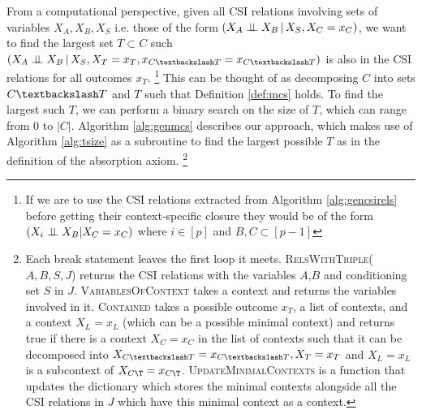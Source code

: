 \documentclass{tufte-book}
\begin{document}
From a computational perspective, given all CSI relations involving sets of variables \(X_A,X_B,X_S\) i.e. those of the form \((X_A \perp \!\!\! \perp X_B \,|\, X_S, X_C=x_C)\), we want to find the largest set \(T \subset C\) such \((X_A \indep X_B \,|\, X_S, X_T=x_T, x_{C \textbackslash T} = x_{C \textbackslash T})\) is also in the CSI relations for all outcomes \(x_T\).  \footnote{If we are to use the CSI relations extracted from Algorithm \ref{alg:gencsirels} before getting their context-specific closure they would be of the form \\ $(X_i \perp \!\!\! \perp X_B | X_C=x_C)$ where $i \in [p]$ and $B ,C \subset [p-1]$}  This can be thought of as decomposing \(C\) into sets \(C \textbackslash T\) and \(T\) such that Definition \ref{def:mcs} holds. To find the largest such \(T\), we can perform a binary search on the size of \(T\), which can range from \(0\) to \(|C|\). Algorithm \ref{alg:genmcs} describes our approach, which makes use of Algorithm \ref{alg:tsize} as a subroutine to find the largest possible \(T\) as in the definition of the absorption axiom.  \footnote{Each break statement leaves the first loop it meets. \textsc{RelsWithTriple}($A,B,S,J$) returns the CSI relations with the variables $A$,$B$ and conditioning set $S$ in $J$. \textsc{VariablesOfContext} takes a context and returns the variables involved in it. \textsc{Contained} takes a possible outcome $x_T$, a list of contexts, and a context $X_L=x_L$ (which can be a possible minimal context) and returns true if there is a context $X_C=x_C$ in the list of contexts such that it can be decomposed into $X_{C\textbackslash T}=x_{C\textbackslash T}, X_T=x_T$ and $X_L=x_L$ is a subcontext of $X_{C\T}=x_{C\T}$. \textsc{UpdateMinimalContexts} is a function that updates the dictionary which stores the minimal contexts alongside all the CSI relations in $J$ which have this minimal context as a context.} 
\end{document}
